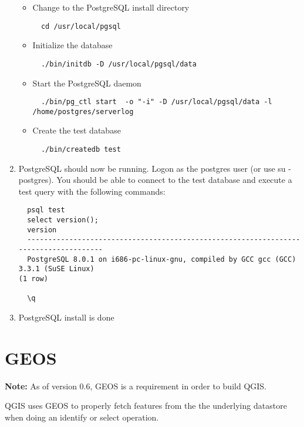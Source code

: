\begin{enumerate}
\begin{itemize}
  \item Change to the PostgreSQL install directory 
  \begin{verbatim}
  cd /usr/local/pgsql
  \end{verbatim}

  \item Initialize the database 
  \begin{verbatim}
  ./bin/initdb -D /usr/local/pgsql/data
  \end{verbatim}

  \item Start the PostgreSQL daemon 
  \small
  \begin{verbatim}
  ./bin/pg_ctl start  -o "-i" -D /usr/local/pgsql/data -l /home/postgres/serverlog 
  \end{verbatim} 
  
  \item Create the test database
  
  \begin{verbatim}
  ./bin/createdb test
  \end{verbatim}
  \normalsize
  \end{itemize}
  \item PostgreSQL should now be running. Logon as the postgres user (or use su - postgres). You should be able to connect to the test database and execute a test query with the following commands: 

  \begin{verbatim}
  psql test
  select version();
  version
  -------------------------------------------------------------------------------------
  PostgreSQL 8.0.1 on i686-pc-linux-gnu, compiled by GCC gcc (GCC) 3.3.1 (SuSE Linux)
(1 row)

  \q
  \end{verbatim}


  \item PostgreSQL install is done
  \end{enumerate}

  \section{GEOS}

  \textbf{Note:} As of version 0.6, GEOS is a requirement in order to build QGIS.
  
  QGIS uses GEOS to properly fetch features from the the underlying datastore
  when doing an identify or select operation.

